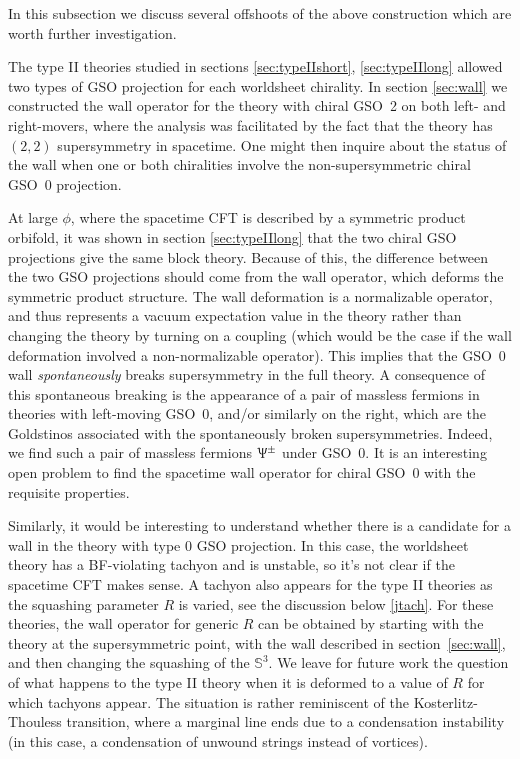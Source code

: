 \documentclass[12pt]{article}
\def\PsiST{\Uppsi}
\newcommand{\bS}{{\mathbb S}}
\numberwithin{equation}{section}
\begin{document}
\label{sec:variants}

In this subsection we discuss several offshoots of the above construction which are worth further investigation.  

The type II theories studied in sections \ref{sec:typeIIshort}, \ref{sec:typeIIlong} allowed two types of GSO projection for each worldsheet chirality. In section \ref{sec:wall} we constructed the wall operator for the theory with chiral GSO~2 on both left- and right-movers, where the analysis was facilitated by the fact that the theory has $(2,2)$ supersymmetry in spacetime. One might then inquire about the status of the wall when one or both chiralities involve the non-supersymmetric chiral GSO~0 projection.

At large $\phi$, where the spacetime CFT is described by a symmetric product orbifold, it was shown in section \ref{sec:typeIIlong} that the two chiral GSO projections give the same block theory. Because of this, the difference between the two GSO projections should come from the wall operator, which deforms the symmetric product structure.  The wall deformation is a normalizable operator, and thus represents a vacuum expectation value in the theory rather than changing the theory by turning on a coupling (which would be the case if the wall deformation involved a non-normalizable operator).  This implies that the GSO~0 wall \textit{spontaneously} breaks supersymmetry in the full theory.  A consequence of this spontaneous breaking is the appearance of a pair of massless fermions in theories with left-moving GSO~0, and/or similarly on the right, which are the Goldstinos associated with the spontaneously broken supersymmetries.  Indeed, we find such a pair of massless fermions $\PsiST^\pm$ under GSO~0.  It is an interesting open problem to find the spacetime wall operator for chiral GSO~0 with the requisite properties.

Similarly, it would be interesting to understand whether there is a candidate for a wall in the theory with type 0 GSO projection. In this case, the worldsheet theory has a BF-violating tachyon and is unstable, so it's not clear if the spacetime CFT makes sense. A tachyon also appears for the type II theories as the squashing parameter $R$ is varied, see the discussion below \eqref{jtach}. For these theories, the wall operator for generic $R$ can be obtained by starting with the theory at the supersymmetric point, with the wall described in section~\ref{sec:wall}, and then changing the squashing of the $\bS^3$. We leave for future work the question of what happens to the type II theory when it is deformed to a value of $R$ for which tachyons appear.
The situation is rather reminiscent of the Kosterlitz-Thouless transition, where a marginal line ends due to a condensation instability (in this case, a condensation of unwound strings instead of vortices).
\end{document}
